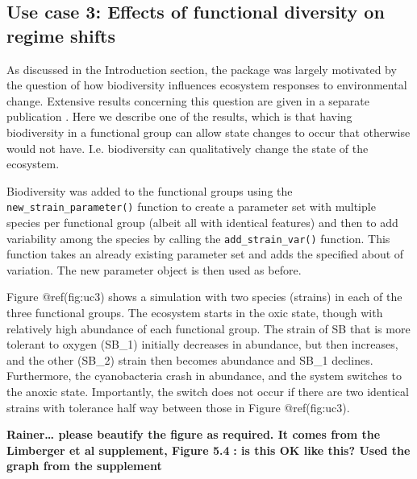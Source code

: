 \documentclass[]{elsarticle} %
\begin{document}
\hypertarget{use-case-3-effects-of-functional-diversity-on-regime-shifts}{%
\subsection{Use case 3: Effects of functional diversity on regime
shifts}\label{use-case-3-effects-of-functional-diversity-on-regime-shifts}}

As discussed in the Introduction section, the package was largely
motivated by the question of how biodiversity influences ecosystem
responses to environmental change. Extensive results concerning this
question are given in a separate publication \citet{Limberger2022}. Here
we describe one of the results, which is that having biodiversity in a
functional group can allow state changes to occur that otherwise would
not have. I.e. biodiversity can qualitatively change the state of the
ecosystem.

Biodiversity was added to the functional groups using the
\texttt{new\_strain\_parameter()} function to create a parameter set
with multiple species per functional group (albeit all with identical
features) and then to add variability among the species by calling the
\texttt{add\_strain\_var()} function. This function takes an already
existing parameter set and adds the specified about of variation. The
new parameter object is then used as before.

Figure @ref(fig:uc3) shows a simulation with two species (strains) in
each of the three functional groups. The ecosystem starts in the oxic
state, though with relatively high abundance of each functional group.
The strain of SB that is more tolerant to oxygen (SB\_1) initially
decreases in abundance, but then increases, and the other (SB\_2) strain
then becomes abundance and SB\_1 declines. Furthermore, the
cyanobacteria crash in abundance, and the system switches to the anoxic
state. Importantly, the switch does not occur if there are two identical
strains with tolerance half way between those in Figure @ref(fig:uc3).

\textbf{Rainer\ldots{} please beautify the figure as required. It comes
from the Limberger et al supplement, Figure 5.4} \textbf{\citet{Owen}:
is this OK like this? Used the graph from the supplement}
\end{document}
